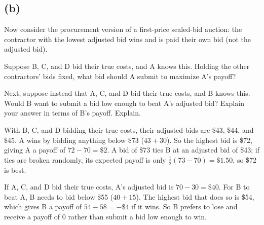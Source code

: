 \documentclass[newpages, arabicsubsec]{assignment}
\begin{document}
\subsection*{(b)}
\begin{problem}
Now consider the procurement version of a first-price sealed-bid auction: the contractor with the lowest adjusted bid wins and is paid their own bid (not the adjusted bid).

Suppose B, C, and D bid their true costs, and A knows this. Holding the other contractors' bids fixed, what bid should A submit to maximize A's payoff?

Next, suppose instead that A, C, and D bid their true costs, and B knows this. Would B want to submit a bid low enough to beat A's adjusted bid? Explain your answer in terms of B's payoff. Explain.
\end{problem}
\begin{solution}
    With B, C, and D bidding their true costs, their adjusted bids are \$43, \$44, and \$45. A wins by bidding anything below \$73 ($43 + 30$). So the highest bid is \$72, giving A a payoff of \(72-70=\$2\). A bid of \$73 ties B at an adjusted bid of \$43; if ties are broken randomly, its expected payoff is only \(\frac{1}{2}(73-70)=\$1.50\), so \$72 is best.

    If A, C, and D bid their true costs, A's adjusted bid is \(70-30=\$40\). For B to beat A, B needs to bid below \$55 ($40 + 15$). The highest bid that does so is \$54, which gives B a payoff of \(54-58=-\$4\) if it wins. So B prefers to lose and receive a payoff of 0 rather than submit a bid low enough to win.
\end{solution}
\end{document}
